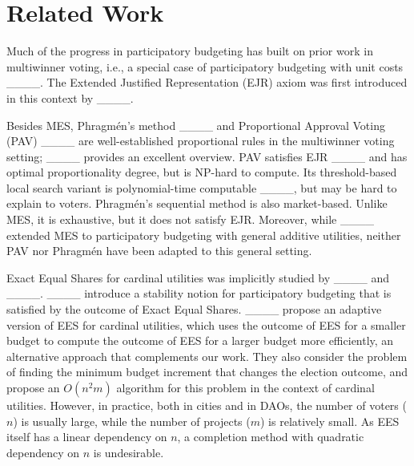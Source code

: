 \section{Related Work}
Much of the progress in participatory budgeting has built on prior work in multiwinner voting, i.e.,
a special case of participatory budgeting with unit costs ____.
The Extended Justified Representation (EJR) axiom was first introduced in this context by ____.

Besides MES, Phragm\'en's method ____ and Proportional Approval Voting (PAV) ____ are well-established proportional rules in the multiwinner voting setting; ____ provides
an excellent overview.
PAV satisfies EJR ____ and has optimal proportionality degree, but is NP-hard to compute. Its threshold-based local search variant 
is polynomial-time computable  ____, but may be hard to explain to voters. 
Phragm\'en's sequential method is also market-based.
Unlike MES, it is exhaustive, but it does not satisfy EJR. %
Moreover, while ____ extended
MES to participatory budgeting with general additive utilities, neither PAV nor Phragm\'en have been adapted to this general setting.

Exact Equal Shares for cardinal utilities was implicitly studied by ____ and ____.
____ introduce a stability notion for participatory budgeting that is satisfied by the outcome of Exact Equal Shares. ____ propose an adaptive version of EES for cardinal utilities, which uses the outcome of EES for a smaller budget to compute the outcome of EES for a larger budget more efficiently, an alternative approach that complements our work.
They also consider the problem of finding the minimum budget increment that changes the election outcome, and propose an $O(n^2m)$ algorithm for this problem in the context of cardinal utilities. However, in practice, both in cities and in DAOs, the number of voters ($n$) is usually large, while the number of projects ($m$) is relatively small. As EES itself has a linear dependency on $n$, a completion method with quadratic dependency on $n$ is undesirable.


